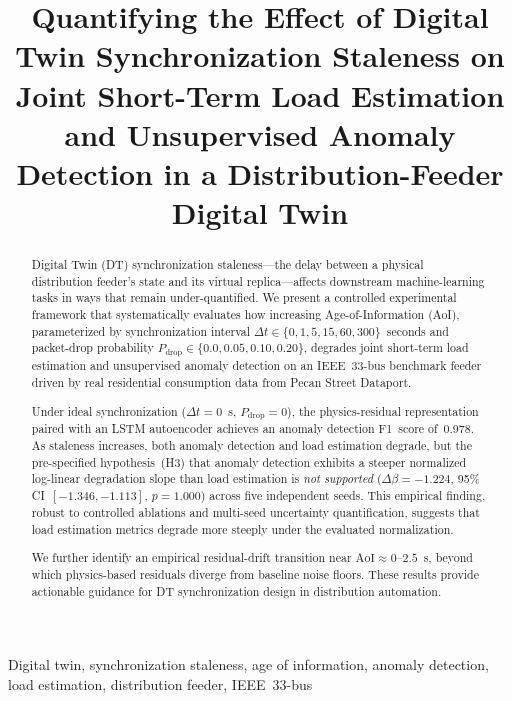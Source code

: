 \documentclass[journal]{IEEEtran}
\newcommand{\dtsync}{\Delta t}
\newcommand{\pdrop}{P_{\mathrm{drop}}}
\newcommand{\aoi}{\mathrm{AoI}}
\newcommand{\dbeta}{\Delta\beta}
\begin{document}
\title{Quantifying the Effect of Digital Twin Synchronization Staleness on Joint Short-Term Load Estimation and Unsupervised Anomaly Detection in a Distribution-Feeder Digital Twin}



\maketitle


\begin{abstract}
Digital Twin (DT) synchronization staleness---the delay between a physical
distribution feeder's state and its virtual replica---affects downstream
machine-learning tasks in ways that remain under-quantified. We present a
controlled experimental framework that systematically evaluates how increasing
Age-of-Information (AoI), parameterized by synchronization interval
$\dtsync \in \{0, 1, 5, 15, 60, 300\}$~seconds and packet-drop probability
$\pdrop \in \{0.0, 0.05, 0.10, 0.20\}$, degrades joint short-term load
estimation and unsupervised anomaly detection on an IEEE~33-bus benchmark
feeder driven by real residential consumption data from Pecan Street Dataport.

Under ideal synchronization ($\dtsync = 0$~s, $\pdrop = 0$), the
physics-residual representation paired with an LSTM autoencoder achieves
an anomaly detection F1~score of~0.978. As staleness increases, both
anomaly detection and load estimation degrade, but the pre-specified
hypothesis~(H3) that anomaly detection exhibits a steeper normalized
log-linear degradation slope than load estimation is \emph{not supported}
($\dbeta = -1.224$, 95\% CI~$[-1.346, -1.113]$, $p = 1.000$) across five
independent seeds. This empirical finding, robust to controlled ablations
and multi-seed uncertainty quantification, suggests that load estimation
metrics degrade more steeply under the evaluated normalization.

We further identify an empirical residual-drift transition near
$\aoi \approx 0$--$2.5$~s, beyond which physics-based residuals diverge
from baseline noise floors. These results provide actionable guidance for
DT synchronization design in distribution automation.
\end{abstract}

\begin{IEEEkeywords}
Digital twin, synchronization staleness, age of information, anomaly
detection, load estimation, distribution feeder, IEEE~33-bus
\end{IEEEkeywords}
\end{document}
